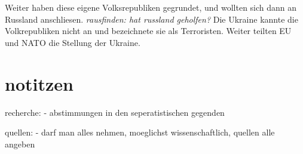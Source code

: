 \documentclass{article}
\begin{document}
Weiter haben diese eigene Volksrepubliken gegrundet, und wollten sich dann an
Russland anschliesen. \textit{rausfinden: hat russland geholfen?}
Die Ukraine kannte die Volkrepubliken nicht an und bezeichnete sie als Terroristen.
Weiter teilten EU und NATO die Stellung der Ukraine.







\section{notitzen}
recherche:
- abstimmungen in den seperatistischen gegenden


quellen:
- darf man alles nehmen, moeglichst wissenschaftlich, quellen alle angeben



\clearpage
\printbibliography
\end{document}
